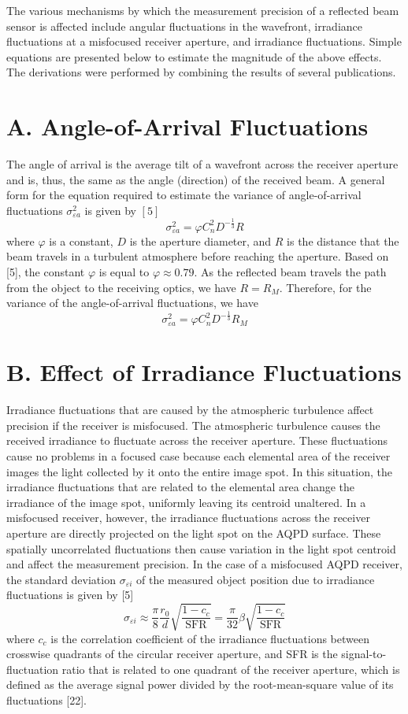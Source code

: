 \documentclass[10pt]{article}
\begin{document}
The various mechanisms by which the measurement precision of a reflected beam sensor is affected include angular fluctuations in the wavefront, irradiance fluctuations at a misfocused receiver aperture, and irradiance fluctuations. Simple equations are presented below to estimate the magnitude of the above effects. The derivations were performed by combining the results of several publications.

\section{A. Angle-of-Arrival Fluctuations}
The angle of arrival is the average tilt of a wavefront across the receiver aperture and is, thus, the same as the angle (direction) of the received beam. A general form for the equation required to estimate the variance of angle-of-arrival fluctuations \(\sigma_{\varepsilon a}^{2}\) is given by \([5]\)
\[
\sigma_{\varepsilon a}^{2}=\varphi C_{n}^{2} D^{-\frac{1}{3}} R
\]
where \(\varphi\) is a constant, \(D\) is the aperture diameter, and \(R\) is the distance that the beam travels in a turbulent atmosphere before reaching the aperture. Based on [5], the constant \(\varphi\) is equal to \(\varphi \approx 0.79\). As the reflected beam travels the path from the object to the receiving optics, we have \(R=R_{M}\). Therefore, for the variance of the angle-of-arrival fluctuations, we have
\[
\sigma_{\varepsilon a}^{2}=\varphi C_{n}^{2} D^{-\frac{1}{3}} R_{M}
\]

\section{B. Effect of Irradiance Fluctuations}
Irradiance fluctuations that are caused by the atmospheric turbulence affect precision if the receiver is misfocused. The atmospheric turbulence causes the received irradiance to fluctuate across the receiver aperture. These fluctuations cause no problems in a focused case because each elemental area of the receiver images the light collected by it onto the entire image spot. In this situation, the irradiance fluctuations that are related to the elemental area change the irradiance of the image spot, uniformly leaving its centroid unaltered. In a misfocused receiver, however, the irradiance fluctuations across the receiver aperture are directly projected on the light spot on the AQPD surface. These spatially uncorrelated fluctuations then cause variation in the light spot centroid and affect the measurement precision. In the case of a misfocused AQPD receiver, the standard deviation \(\sigma_{\varepsilon i}\) of the measured object position due to irradiance fluctuations is given by [5]
\[
\sigma_{\varepsilon i} \approx \frac{\pi}{8} \frac{r_{0}}{d} \sqrt{\frac{1-c_{c}}{\mathrm{SFR}}}=\frac{\pi}{32} \beta \sqrt{\frac{1-c_{c}}{\mathrm{SFR}}}
\]
where \(c_{c}\) is the correlation coefficient of the irradiance fluctuations between crosswise quadrants of the circular receiver aperture, and SFR is the signal-to-fluctuation ratio that is related to one quadrant of the receiver aperture, which is defined as the average signal power divided by the root-mean-square value of its fluctuations [22].
\end{document}
